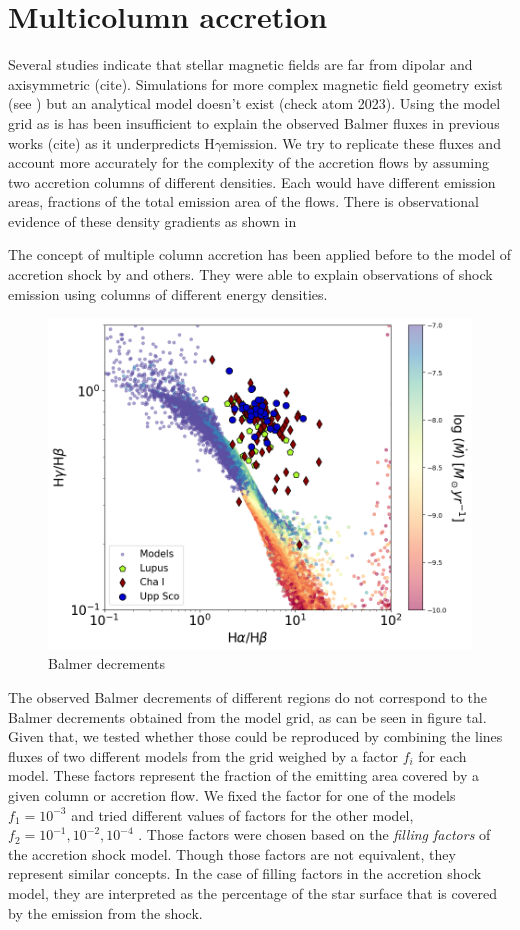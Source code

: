 \documentclass[twocolumn,linenumbers]{aastex631}
\newcommand{\hgamma}{H$\gamma$}
\begin{document}
\section{Multicolumn accretion}

Several studies indicate that stellar magnetic fields are far from dipolar and axisymmetric (cite). Simulations for more complex magnetic field geometry exist (see \citet{romanova2003}) but an analytical model doesn't exist (check atom 2023). Using the model grid as is has been insufficient to explain the observed Balmer fluxes in previous works (cite) as it underpredicts \hgamma emission. We try to replicate these fluxes and account more accurately for the complexity of the accretion flows by assuming two accretion columns of different densities. Each would have different emission areas, fractions of the total emission area of the flows. There is observational evidence of these density gradients as shown in \citet{}

 The concept of multiple column accretion has been applied before to the model of accretion shock by \citet{pittman2022} and others. They were able to explain observations of shock emission using columns of different energy densities. 

\begin{figure}
    \centering
    \includegraphics[width=0.8\linewidth]{figures/BalmerDecrements.png}
    \caption{Balmer decrements}
    \label{fig:balmer_decrement}
\end{figure}

The observed Balmer decrements of different regions do not correspond to the Balmer decrements obtained from the model grid, as can be seen in figure tal. Given that, we tested whether those could be reproduced by combining the lines fluxes of two different models from the grid weighed by a factor $f_i$ for each model. These factors represent the fraction of the emitting area covered by a given column or accretion flow. We fixed the factor for one of the models $f_1=10^{-3}$ and tried different values of factors for the other model, $f_2 = 10^{-1},10^{-2},10^{-4}$ .  Those factors were chosen based on the \textit{filling factors} of the accretion shock model. Though those factors are not equivalent, they represent similar concepts. In the case of filling factors in the accretion shock model, they are interpreted as the percentage of the star surface that is covered by the emission from the shock.
\end{document}
